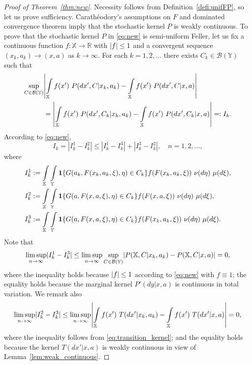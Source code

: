 \documentclass[11pt,onecolumn]{IEEEtran}  %
\newcommand{\Rb}{\mathbb{R}}
\newcommand{\Xb}{\mathbb{X}}
\newcommand{\Yb}{\mathbb{Y}}
\newcommand{\Bc}{\mathcal{B}}
\newcommand{\one}[1]{\mathbf{1}\set{#1}}
\DeclarePairedDelimiter{\set}{\{}{\}}
\DeclarePairedDelimiter{\abs}{|}{|}
\theoremstyle{definition}
\begin{document}
\begin{proof}[Proof of Theorem~\ref{thm:new}]
    Necessity follows from Definition~\ref{defi:unifFP}, so let us prove sufficiency. Carath\'eodory's assumptions on $F$ and dominated convergence theorem imply that the stochastic kernel $P$ is weakly continuous. To prove that the stochastic kernel $P$ in \eqref{eq:new} is semi-uniform Feller, let us fix a continuous function $f : \Xb \to \Rb$ with $\abs{f} \leq 1$ and a convergent sequence $(x_{k},a_{k}) \to (x,a)$ as $k\to\infty.$ For each $k=1,2,\ldots$ there exists $C_{k}\in\Bc(\Yb)$ such that
    \begin{equation}
        \begin{aligned}
        \sup_{C\in\Bc(\Yb)} &\abs*{
            \int\limits_{\Xb} f(x') \ P(dx',C|x_{k},a_{k})-\int\limits_{\Xb} f(x') \ P(dx',C|x,a)
        } \\
        &= \abs*{
            \int\limits_{\Xb} f(x') \ P(dx',C_{k}|x_{k},a_{k})-\int\limits_{\Xb} f(x') \ P(dx',C_{k}|x,a)
        }=:I_{k}.
        \end{aligned}
    \end{equation}
    According to \eqref{eq:new},
    \begin{equation}
        I_{k} = |I^1_{k}-I^2_{k}|\le |I^1_{k}-I^3_{k}|+|I^3_{k}-I^2_{k}|,\quad n=1,2,\ldots,
    \end{equation}
    where
    \begin{align*}
        I^1_{k} &:= \int\limits_{\Xb}\int\limits_{\Yb} \one{G(a_{k},F(x_{k},a_{k},\xi),\eta) \in C_{k}} f(F(x_{k},a_{k},\xi)) \ \nu(d\eta) \ \mu(d\xi),\\
        I^2_{k} &:= \int\limits_{\Xb}\int\limits_{\Yb} \one{G(a,F(x,a,\xi),\eta)\in C_{k}}f(F(x,a,\xi)) \ \nu(d\eta) \ \mu(d\xi),\\
        I^3_{k} &:= \int\limits_{\Xb}\int\limits_{\Yb} \one{G(a,F(x,a,\xi),\eta)\in C_{k}}f(F(x_{k},a_{k},\xi)) \ \nu(d\eta) \ \mu(d\xi).
    \end{align*}
    Note that
    \begin{equation}\label{eq:new2}
        \limsup_{n\to \infty} \abs{I^1_{k}-I^3_{k}} \le \limsup_{n\to \infty} \sup_{C\in\Bc(\Yb)}\abs{P(\Xb,C|x_{k},a_{k})-P(\Xb,C|x,a)}=0,
    \end{equation}
    where the inequality holds because $\abs{f} \leq 1$ according to \eqref{eq:new} with $f\equiv 1$; the equality holds because the marginal kernel $P'(dy|x,a)$ is continuous in total variation.
    We remark also
    \begin{equation}\label{eq:new3}
        \limsup_{n\to \infty} \abs{I^2_{k}-I^3_{k}} \le \limsup_{n\to \infty} \abs*{\int\limits_{\Xb} f(x') \ T(dx'|x_{k},a_{k})-\int\limits_{\Xb} f(x') \ T(dx'|x,a)} = 0,
    \end{equation}
    where the inequality follows from \eqref{eq:transition_kernel}; and the equality holds because the kernel $T(dx'|x,a)$ is weakly continuous in view of Lemma~\ref{lem:weak_continuous}.
\end{proof}
\end{document}
